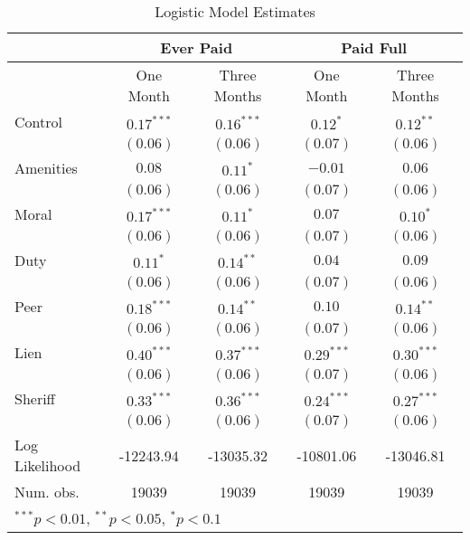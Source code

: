 \documentclass[12pt]{article}
\begin{document}
\begin{table}[htbp]
\caption{Logistic Model Estimates}
\begin{center}
\begin{tabular}{l c c c c }
\hline
 & \multicolumn{2}{c}{Ever Paid} & \multicolumn{2}{c}{Paid Full} \\
\hline
 & One Month & Three Months & One Month & Three Months \\
\hline
Control        & $0.17^{***}$ & $0.16^{***}$ & $0.12^{*}$   & $0.12^{**}$  \\
               & $(0.06)$     & $(0.06)$     & $(0.07)$     & $(0.06)$     \\
Amenities      & $0.08$       & $0.11^{*}$   & $-0.01$      & $0.06$       \\
               & $(0.06)$     & $(0.06)$     & $(0.07)$     & $(0.06)$     \\
Moral          & $0.17^{***}$ & $0.11^{*}$   & $0.07$       & $0.10^{*}$   \\
               & $(0.06)$     & $(0.06)$     & $(0.07)$     & $(0.06)$     \\
Duty           & $0.11^{*}$   & $0.14^{**}$  & $0.04$       & $0.09$       \\
               & $(0.06)$     & $(0.06)$     & $(0.07)$     & $(0.06)$     \\
Peer           & $0.18^{***}$ & $0.14^{**}$  & $0.10$       & $0.14^{**}$  \\
               & $(0.06)$     & $(0.06)$     & $(0.07)$     & $(0.06)$     \\
Lien           & $0.40^{***}$ & $0.37^{***}$ & $0.29^{***}$ & $0.30^{***}$ \\
               & $(0.06)$     & $(0.06)$     & $(0.07)$     & $(0.06)$     \\
Sheriff        & $0.33^{***}$ & $0.36^{***}$ & $0.24^{***}$ & $0.27^{***}$ \\
               & $(0.06)$     & $(0.06)$     & $(0.07)$     & $(0.06)$     \\
\hline
Log Likelihood & -12243.94    & -13035.32    & -10801.06    & -13046.81    \\
Num. obs.      & 19039        & 19039        & 19039        & 19039        \\
\hline
\multicolumn{5}{l}{\scriptsize{$^{***}p<0.01$, $^{**}p<0.05$, $^*p<0.1$}}
\end{tabular}
\label{tbl:reg8_3mo}
\end{center}
\end{table}
\end{document}
